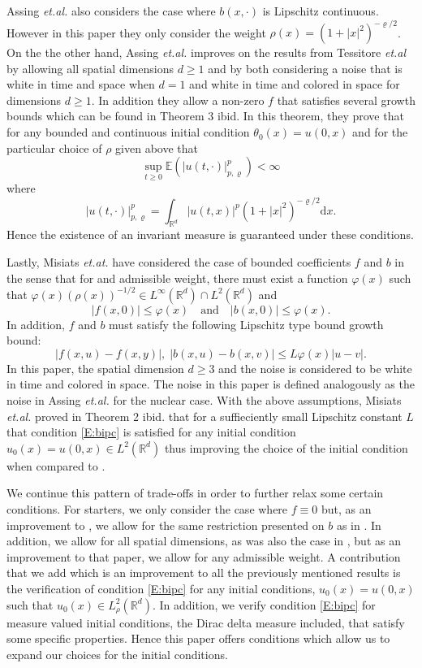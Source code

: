 \documentclass[a4paper,11pt]{article}%
\numberwithin{equation}{section}
\theoremstyle{plain}
\theoremstyle{definition}
\newcommand{\R}{\mathbb{R}}
\newcommand{\ud}{\ensuremath{ \mathrm{d} }}
\begin{document}
Assing \textit{et.al.} \cite{AM03} also considers the case where $b(x,\cdot)$ is Lipschitz continuous. However in this paper they only consider the weight $\rho(x) = (1+|x|^2)^{-\varrho/2}$. On the the other hand, Assing \textit{et.al.} improves on the results from Tessitore \textit{et.al} \cite{TessitoreZabczyk98M} by allowing all spatial dimensions $d\ge 1$ and by both considering a noise that is white in time and space when $d=1$ and white in time and colored in space for dimensions $d \ge 1$. In addition they allow a non-zero $f$ that satisfies several growth bounds which can be found in Theorem 3 ibid. In this theorem, they prove that for any bounded and continuous initial condition $\theta_0(x) = u(0,x)$ and for the particular choice of $\rho$ given above that
	\[
		\sup_{t \ge 0} \mathbb{E}(|u(t,\cdot)|_{p,\varrho}^p) < \infty
	\]
where
	\[
		|u(t,\cdot)|_{p,\varrho}^p = \int_{\R^d} |u(t,x)|^p (1+|x|^2)^{-\varrho/2} \ud x.
	\]
Hence the existence of an invariant measure is guaranteed under these conditions.

Lastly, Misiats \textit{et.at.} \cite{MSY16} have considered the case of bounded coefficients $f$ and $b$ in the sense that for and admissible weight, there must exist a function $\varphi(x)$ such that $\varphi(x)(\rho(x))^{-1/2} \in L^\infty(\R^d) \cap L^2(\R^d)$ and
	\[
		|f(x,0)| \le \varphi(x) \quad \text{and} \quad |b(x,0)| \le \varphi(x).
	\]
In addition, $f$ and $b$ must satisfy the following Lipschitz type bound growth bound:
	\[
		|f(x,u) - f(x,y)|, \; |b(x,u) - b(x,v)| \le L\varphi(x)|u-v|.
	\]
In this paper, the spatial dimension $d\ge3$ and the noise is considered to be white in time and colored in space. The noise in this paper is defined analogously as the noise in Assing \textit{et.al.} \cite{AM03} for the nuclear case. With the above assumptions, Misiats \textit{et.al.} proved in Theorem 2 ibid. that for a suffieciently small Lipschitz constant $L$ that condition \eqref{E:bipc} is satisfied for any initial condition $u_0(x) = u(0,x) \in L^2(\R^d)$ thus improving the choice of the initial condition when compared to \cite{TessitoreZabczyk98M,AM03}.

We continue this pattern of trade-offs in order to further relax some certain conditions. For starters, we only consider the case where $f\equiv0$ but, as an improvement to \cite{MSY16}, we allow for the same restriction presented on $b$ as in \cite{TessitoreZabczyk98M}. In addition, we allow for all spatial dimensions, as was also the case in \cite{AM03}, but as an improvement to that paper, we allow for any admissible weight. A contribution that we add which is an improvement to all the previously mentioned results is the verification of condition \eqref{E:bipc} for any initial conditions, $u_0(x) = u(0,x)$ such that  $u_0(x) \in L^2_{\rho}(\R^d)$. In addition, we verify condition \eqref{E:bipc} for measure valued initial conditions, the Dirac delta measure included, that satisfy some specific properties. Hence this paper offers conditions which allow us to expand our choices for the initial conditions.
\end{document}
